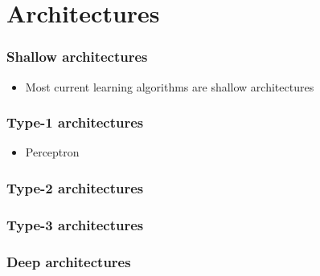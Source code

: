 \section{Architectures}

\begin{frame}
	\frametitle{Shallow architectures}
	\begin{itemize}
		\item Most current learning algorithms are shallow architectures
	\end{itemize}
\end{frame}

\begin{frame}
	\frametitle{Type-1 architectures}
	\begin{itemize}
		\item Perceptron
	\end{itemize}
\end{frame}

\begin{frame}
	\frametitle{Type-2 architectures}
\end{frame}

\begin{frame}
	\frametitle{Type-3 architectures}
\end{frame}

\begin{frame}
	\frametitle{Deep architectures}
\end{frame}
